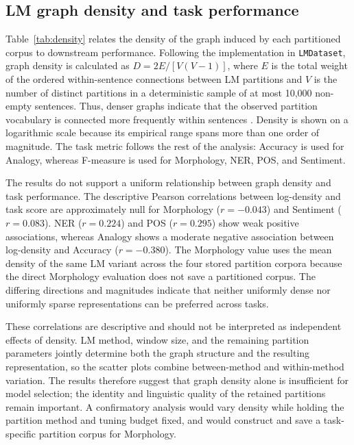 \subsection{LM graph density and task performance}

Table~\ref{tab:density} relates the density of the graph induced by each
partitioned corpus to downstream performance. Following the implementation in
\texttt{LMDataset}, graph density is calculated as
$D=2E/[V(V-1)]$, where $E$ is the total weight of the ordered within-sentence
connections between LM partitions and $V$ is the number of distinct
partitions in a deterministic sample of at most 10,000 non-empty sentences.
Thus, denser graphs indicate that the observed partition vocabulary is
connected more frequently within sentences \citep{west2001}. Density is shown
on a logarithmic scale because its empirical range spans more than one order
of magnitude. The task metric follows the rest of the analysis: Accuracy is
used for Analogy, whereas F-measure is used for Morphology, NER, POS, and
Sentiment.

The results do not support a uniform relationship between graph density and
task performance. The descriptive Pearson correlations between log-density
and task score are approximately null for Morphology ($r=-0.043$) and
Sentiment ($r=0.083$). NER ($r=0.224$) and POS ($r=0.295$) show weak positive
associations, whereas Analogy shows a moderate negative association between
log-density and Accuracy ($r=-0.380$). The Morphology value uses the mean
density of the same LM variant across the four stored partition corpora
because the direct Morphology evaluation does not save a partitioned corpus.
The differing directions and magnitudes indicate that neither uniformly
dense nor uniformly sparse representations can be preferred across tasks.

These correlations are descriptive and should not be interpreted as
independent effects of density. LM method, window size, and the remaining
partition parameters jointly determine both the graph structure and the
resulting representation, so the scatter plots combine between-method and
within-method variation. The results therefore suggest that graph density
alone is insufficient for model selection; the identity and linguistic
quality of the retained partitions remain important. A confirmatory analysis
would vary density while holding the partition method and tuning budget
fixed, and would construct and save a task-specific partition corpus for
Morphology.

